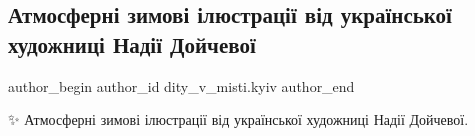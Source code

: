  
 
 
 
 
 
\subsection{Атмосферні зимові ілюстрації від української художниці Надії Дойчевої}
\label{sec:11_12_2022.fb.dity_v_misti.kyiv.1.illustracii_dojcheva}
 
\ifcmt
 author_begin
   author_id dity_v_misti.kyiv
 author_end
\fi

✨ Атмосферні зимові ілюстрації від української художниці Надії Дойчевої.
